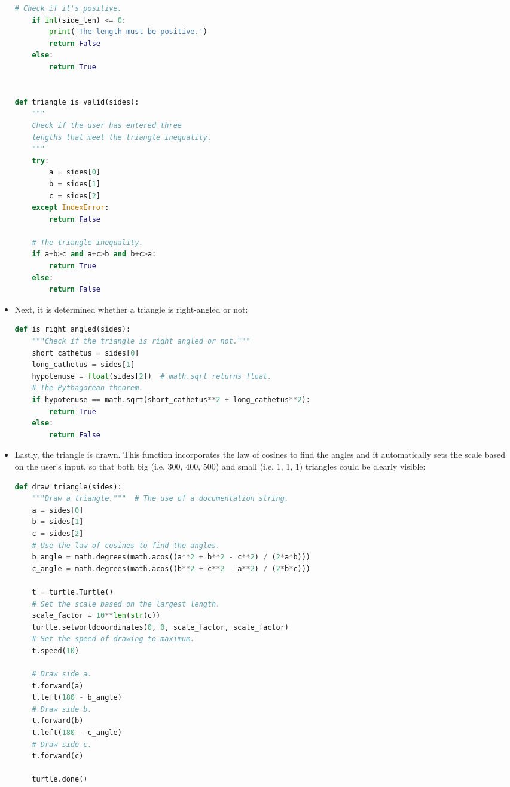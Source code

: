 \documentclass{article}
\begin{document}
\begin{itemize}
\begin{lstlisting}[language=Python]
    # Check if it's positive.
    if int(side_len) <= 0:
        print('The length must be positive.')
        return False
    else:
        return True


def triangle_is_valid(sides):
    """
    Check if the user has entered three
    lengths that meet the triangle inequality.
    """
    try:
        a = sides[0]
        b = sides[1]
        c = sides[2]
    except IndexError:
        return False

    # The triangle inequality.
    if a+b>c and a+c>b and b+c>a:
        return True
    else:
        return False
\end{lstlisting}

    \item Next, it is determined whether a triangle is right-angled or not:
\begin{lstlisting}[language=Python]
def is_right_angled(sides):
    """Check if the triangle is right angled or not."""
    short_cathetus = sides[0]
    long_cathetus = sides[1]
    hypotenuse = float(sides[2])  # math.sqrt returns float.
    # The Pythagorean theorem.
    if hypotenuse == math.sqrt(short_cathetus**2 + long_cathetus**2):
        return True
    else:
        return False
\end{lstlisting}

\item Lastly, the triangle is drawn. This function incorporates the law of
    cosines to find the angles and it automatically sets the scale based on the
    user's input, so that both big (i.e. 300, 400, 500) and small (i.e. 1, 1,
    1) triangles could be clearly visible:
\begin{lstlisting}[language=Python]
def draw_triangle(sides):
    """Draw a triangle."""  # The use of a documentation string.
    a = sides[0]
    b = sides[1]
    c = sides[2]
    # Use the law of cosines to find the angles.
    b_angle = math.degrees(math.acos((a**2 + b**2 - c**2) / (2*a*b)))
    c_angle = math.degrees(math.acos((b**2 + c**2 - a**2) / (2*b*c)))

    t = turtle.Turtle()
    # Set the scale based on the largest length.
    scale_factor = 10**len(str(c))
    turtle.setworldcoordinates(0, 0, scale_factor, scale_factor)
    # Set the speed of drawing to maximum.
    t.speed(10)

    # Draw side a.
    t.forward(a)
    t.left(180 - b_angle)
    # Draw side b.
    t.forward(b)
    t.left(180 - c_angle)
    # Draw side c.
    t.forward(c)

    turtle.done()
\end{lstlisting}

\end{itemize}
\end{document}
